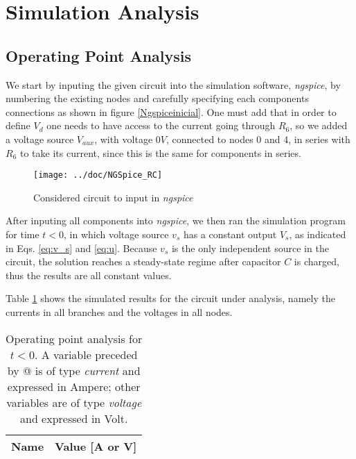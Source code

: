 \section{Simulation Analysis}
\label{sec:simulation}

\subsection{Operating Point Analysis}

We start by inputing the given circuit into the simulation software, \emph{ngspice}, by numbering the existing nodes and carefully specifying each components connections as shown in figure \ref{Ngspiceinicial}.
One must add that in order to define $V_d$ one needs to have access to the current going through $R_6$, so we added a voltage source $V_{aux}$, with voltage $0V$, connected to nodes 0 and 4, in series with $R_6$ to take its current, since this is the same for components in series.

\begin{figure}[H]
  \centering
  \texttt{[image: ../doc/NGSpice\_RC]}
  \caption{Considered circuit to input in \emph{ngspice}}
  \label{fig:fignodos}
\end{figure}

After inputing all components into \emph{ngspice}, we then ran the simulation program for time $t<0$, in which voltage source $v_s$ has a constant output $V_s$, as indicated in Eqs. \ref{eq:v_s} and \ref{eq:u}. Because $v_s$ is the only independent source in the circuit, the solution reaches a steady-state regime after capacitor $C$ is charged, thus the results are all constant values.


Table \ref{tab:ngspice_1} shows the simulated results for the circuit
under analysis, namely the currents in all branches and the voltages in all nodes.
\begin{multicols}{2}

\begin{table}[H]
  \centering
  \begin{tabular}{|l|r|}
    \hline
    {\bf Name} & {\bf Value [A or V]} \\ \hline
    
  \end{tabular}
  \caption{Operating point analysis for $t<0$. A variable preceded by @ is of type {\em current}
    and expressed in Ampere; other variables are of type {\it voltage} and expressed in
    Volt.}
  \label{tab:ngspice_1}
\end{table}

\end{multicols}

